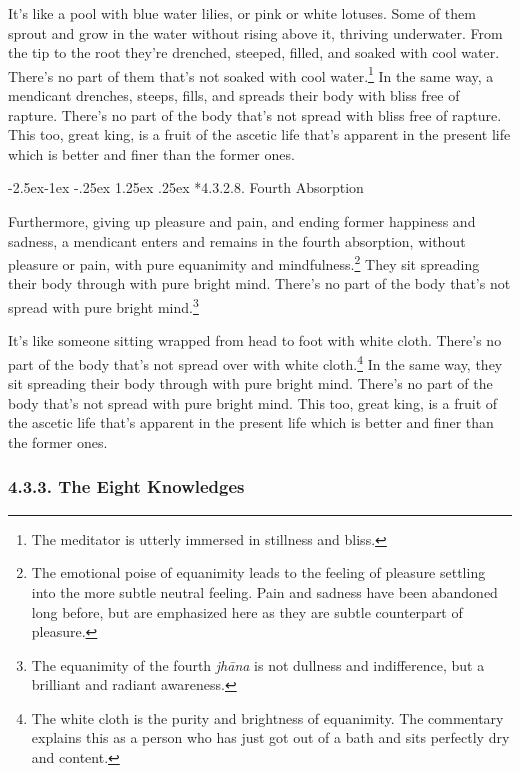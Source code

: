 \documentclass[12pt,openany]{book}%
\makeatletter
\renewcommand\paragraph{\@startsection{paragraph}{4}{\z@}%
            {-2.5ex\@plus -1ex \@minus -.25ex}%
            {1.25ex \@plus .25ex}%
            {\noindent\normalfont\itshape\small}}
\makeatother
\begin{document}
It’s like a pool with blue water lilies, or pink or white lotuses. Some of them sprout and grow in the water without rising above it, thriving underwater. From the tip to the root they’re drenched, steeped, filled, and soaked with cool water. There’s no part of them that’s not soaked with cool water.\footnote{The meditator is utterly immersed in stillness and bliss. } In the same way, a mendicant drenches, steeps, fills, and spreads their body with bliss free of rapture. There’s no part of the body that’s not spread with bliss free of rapture. This too, great king, is a fruit of the ascetic life that’s apparent in the present life which is better and finer than the former ones. 

\paragraph*{4.3.2.8. Fourth Absorption }

Furthermore, giving up pleasure and pain, and ending former happiness and sadness, a mendicant enters and remains in the fourth absorption, without pleasure or pain, with pure equanimity and mindfulness.\footnote{The emotional poise of equanimity leads to the feeling of pleasure settling into the more subtle neutral feeling. Pain and sadness have been abandoned long before, but are emphasized here as they are subtle counterpart of pleasure. } They sit spreading their body through with pure bright mind. There’s no part of the body that’s not spread with pure bright mind.\footnote{The equanimity of the fourth \textit{\textsanskrit{jhāna}} is not dullness and indifference, but a brilliant and radiant awareness. } 

It’s like someone sitting wrapped from head to foot with white cloth. There’s no part of the body that’s not spread over with white cloth.\footnote{The white cloth is the purity and brightness of equanimity. The commentary explains this as a person who has just got out of a bath and sits perfectly dry and content. } In the same way, they sit spreading their body through with pure bright mind. There’s no part of the body that’s not spread with pure bright mind. This too, great king, is a fruit of the ascetic life that’s apparent in the present life which is better and finer than the former ones. 

\subsubsection*{4.3.3. The Eight Knowledges }
\end{document}
